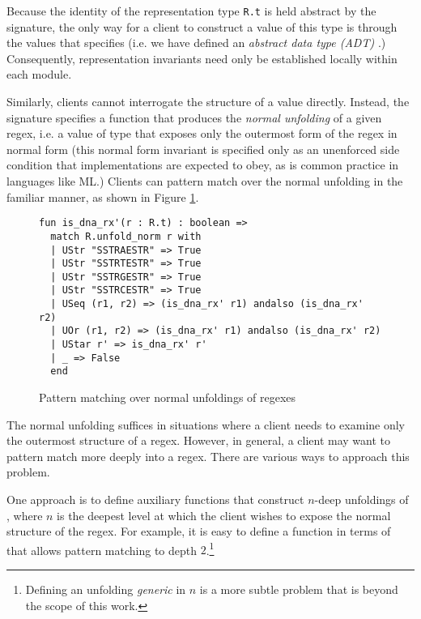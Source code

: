 Because the identity of the representation type \lstinline{R.t} is held abstract by the signature, the only way for a client to construct a value of this type is through the values that  specifies (i.e. we have defined an \emph{abstract data type (ADT)}  \cite{liskov1974programming}.) Consequently, representation invariants need only be established locally within each module.




Similarly, clients cannot interrogate the structure of a value  directly. Instead, the signature specifies a function  that produces the \emph{normal unfolding} of a given regex, i.e. a value of type  that exposes only the outermost form of the regex in normal form (this normal form invariant is specified only as an unenforced side condition that implementations are expected to obey, as is common practice in languages like ML.) Clients can pattern match over the {normal unfolding} in the familiar manner, as shown in Figure \ref{fig:is_dna_rx_prime}. 
\begin{figure}
\begin{lstlisting}[numbers=none]
fun is_dna_rx'(r : R.t) : boolean => 
  match R.unfold_norm r with 
  | UStr "SSTRAESTR" => True
  | UStr "SSTRTESTR" => True
  | UStr "SSTRGESTR" => True
  | UStr "SSTRCESTR" => True
  | USeq (r1, r2) => (is_dna_rx' r1) andalso (is_dna_rx' r2)
  | UOr (r1, r2) => (is_dna_rx' r1) andalso (is_dna_rx' r2)
  | UStar r' => is_dna_rx' r'
  | _ => False
  end
\end{lstlisting}
\vspace{-5px}
\caption{Pattern matching over normal unfoldings of regexes}
\label{fig:is_dna_rx_prime}
\end{figure}

The normal unfolding suffices in situations where a client needs to examine only the outermost structure of a regex. However, in general, a client may want to pattern match more deeply into a regex. There are various ways to approach this problem. 

One approach is to define auxiliary functions that construct $n$-deep unfoldings of , where $n$ is the deepest level at which the client wishes to expose the normal structure of the regex. For example, it is easy to define a function  in terms of  that allows pattern matching to depth $2$.\footnote{Defining an unfolding \emph{generic} in $n$ is a more subtle problem that is beyond the scope of this work.} 

